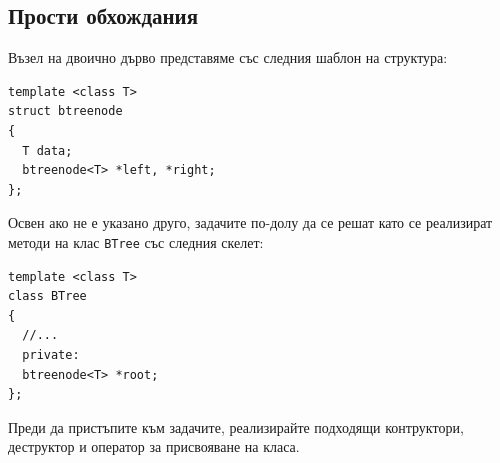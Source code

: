 \documentclass[12pt,a4paper]{article}
\newcommand{\code}[1]{\texttt{#1}}
\begin{document}
\subsection {Прости обхождания}

\begin{mdframed}[hidealllines=true,backgroundcolor=gray!20]
Възел на двоично дърво представяме със следния шаблон на структура:
\begin{verbatim}
template <class T>
struct btreenode
{
  T data;
  btreenode<T> *left, *right;
};
\end{verbatim}
Освен ако не е указано друго, задачите по-долу да се решат като се реализират методи на клас \code{BTree} със следния скелет:
\begin{verbatim}
template <class T>
class BTree
{
  //...
  private:
  btreenode<T> *root;
};
\end{verbatim}
Преди да пристъпите към задачите, реализирайте подходящи контруктори, деструктор и оператор за присвояване на класа.
\end{mdframed}
\end{document}
